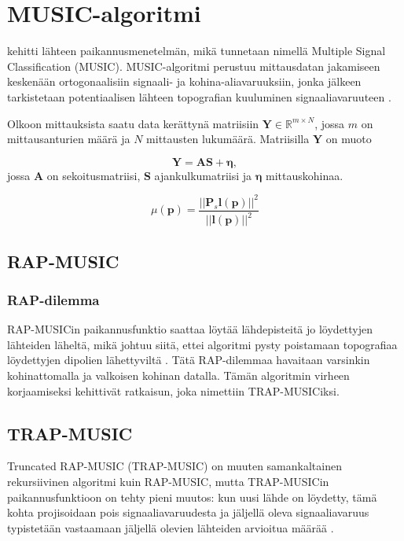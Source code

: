 \section{MUSIC-algoritmi}
\cite{Schmidt1986MultipleEstimation} kehitti lähteen paikannusmenetelmän, mikä tunnetaan nimellä Multiple Signal Classification (MUSIC). MUSIC-algoritmi perustuu mittausdatan jakamiseen keskenään ortogonaalisiin signaali- ja kohina-aliavaruuksiin, jonka jälkeen tarkistetaan potentiaalisen lähteen topografian kuuluminen signaaliavaruuteen \cite{Mosher1999SourceMUSIC}.

Olkoon mittauksista saatu data kerättynä matriisiin $\mathbf{Y}\in \mathbb{R}^{m\times N}$, jossa $\mathit{m}$ on mittausanturien määrä ja $\mathit{N}$ mittausten lukumäärä. Matriisilla $\mathbf{Y}$ on muoto

\begin{equation}
    \mathbf{Y=AS+\eta},
\end{equation}
jossa $\mathbf{A}$ on sekoitusmatriisi, $\mathbf{S}$ ajankulkumatriisi ja $\mathbf{\eta}$ mittauskohinaa. 

\begin{equation}
    \mu(\mathbf{p}) = \frac{||\mathbf{P}_s\mathbf{l(p)}||^2}{||\mathbf{l(p)}||^2}    
\end{equation}


\subsection{RAP-MUSIC}

\subsubsection{RAP-dilemma}
RAP-MUSICin paikannusfunktio saattaa löytää lähdepisteitä jo löydettyjen lähteiden läheltä, mikä johtuu siitä, ettei algoritmi pysty poistamaan topografiaa löydettyjen dipolien lähettyviltä \cite{Makela2018TruncatedLocalization}. Tätä RAP-dilemmaa havaitaan varsinkin kohinattomalla ja valkoisen kohinan datalla. Tämän algoritmin virheen korjaamiseksi \cite{Makela2018TruncatedLocalization} kehittivät ratkaisun, joka nimettiin TRAP-MUSICiksi. 

\subsection{TRAP-MUSIC}
Truncated RAP-MUSIC (TRAP-MUSIC) on muuten samankaltainen rekursiivinen algoritmi kuin RAP-MUSIC, mutta TRAP-MUSICin paikannusfunktioon on tehty pieni muutos: kun uusi lähde on löydetty, tämä kohta projisoidaan pois signaaliavaruudesta ja jäljellä oleva signaaliavaruus typistetään vastaamaan jäljellä olevien lähteiden arvioitua määrää \cite{Makela2018TruncatedLocalization}.